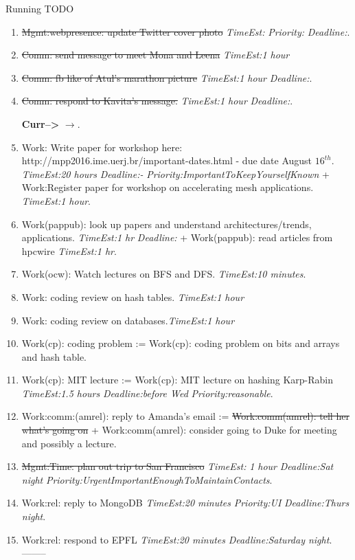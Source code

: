 \documentclass[serif, mathserif, final]{beamer}
\newcommand{\doneTaskNoItem}[1]{\sout{#1}}
\newcommand{\doneTask}[1]{\tiny \item \tiny \sout{#1}}
\newcommand{\te}[1]{\textit{TimeEst:}\textit{#1}}
\newcommand{\dl}[1]{\textit{Deadline:}\textit{#1}}
\newcommand{\pr}[1]{\textit{Priority:}\textit{#1}}
\begin{document}
\begin{frame}
\begin{columns}
\begin{column}{0.5\linewidth}
\begin{block}{Running TODO}
\begin{enumerate}
          TODO:L3: Interview Outcome v VS Outcome of interview VS
          Interview's Outcome just: be casual, but formal - done 
          TODO:L4:  VS - 
          TODO:L5: please VS [OMIT] 
          TODO:L5:  Thanks VS [OMIT]
        \doneTask{ Mgmt:webpresence: update Twitter cover
          photo} \te{} \pr{} \dl{}. 

        \doneTask{Comm: send message to meet Mona and Leena } \te{1
          hour} 

        \doneTask{Comm: fb like of Atul's marathon picture} \te{1 hour} \dl{}. 
        \doneTask{Comm: respond to Kavita's message.} \te{1 hour}
        \dl{}.


          \textbf{Curr-->} $\rightarrow$. 

        \item \tiny Work: Write paper for workshop here:
          http://mpp2016.ime.uerj.br/important-dates.html - due date 
          August $16^{th}$.  \te{20 hours} \dl{-}
          \pr{ImportantToKeepYourselfKnown} + Work:Register paper for
          workshop on accelerating mesh applications. \te{1 hour}.

        \item \tiny Work(pappub): look up papers and understand
          architectures/trends, applications. \te{1 hr} \dl{} +
          Work(pappub): read articles from hpcwire \te{1 hr}.

        \item \tiny Work(ocw): Watch lectures on BFS and DFS. \te{10
          minutes}.
        \item \tiny Work: coding review on hash tables. \te{1 hour} 
        \item \tiny Work: coding review on databases.\te{1 hour} 
        \item \tiny Work(cp): coding problem := Work(cp): coding
          problem on bits and arrays and hash table. 


        \item \tiny Work(cp): MIT lecture := Work(cp): MIT lecture on
          hashing Karp-Rabin \te{1.5 hours} \dl{before Wed}
          \pr{reasonable}.
 
        \item \tiny Work:comm:(amrel): reply to Amanda's email :=
          \doneTaskNoItem{Work:comm(amrel): tell her what's going on}  +
          Work:comm(amrel): consider going to Duke for meeting and
          possibly a lecture.
         \doneTask{Mgmt:Time: plan out trip to San Francisco} \te{ 1
           hour} \dl{Sat night} \pr{UrgentImportantEnoughToMaintainContacts}. 
        \item \tiny Work:rel: reply to MongoDB \te{20 minutes} \pr{UI}
          \dl{Thurs night}. 
        \item \tiny Work:rel: respond to EPFL \te{20 minutes}
          \dl{Saturday night}. --------


\end{enumerate}
\end{block}
\end{column}
\end{columns}
\end{frame}
\end{document}
